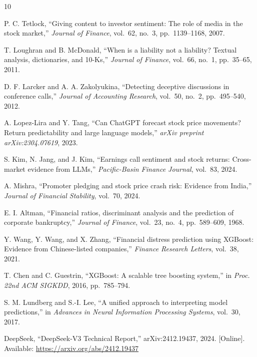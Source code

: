\documentclass[conference]{IEEEtran}
\begin{document}
\begin{thebibliography}{10}

P. C. Tetlock, ``Giving content to investor sentiment: The role of media
in the stock market,'' \textit{Journal of Finance}, vol.~62, no.~3,
pp.~1139--1168, 2007.

T. Loughran and B. McDonald, ``When is a liability not a liability?
Textual analysis, dictionaries, and 10-Ks,'' \textit{Journal of Finance},
vol.~66, no.~1, pp.~35--65, 2011.

D. F. Larcker and A. A. Zakolyukina, ``Detecting deceptive discussions in
conference calls,'' \textit{Journal of Accounting Research}, vol.~50,
no.~2, pp.~495--540, 2012.

A. Lopez-Lira and Y. Tang, ``Can ChatGPT forecast stock price movements?
Return predictability and large language models,'' \textit{arXiv preprint
arXiv:2304.07619}, 2023.

S. Kim, N. Jang, and J. Kim, ``Earnings call sentiment and stock returns:
Cross-market evidence from LLMs,'' \textit{Pacific-Basin Finance Journal},
vol.~83, 2024.

A. Mishra, ``Promoter pledging and stock price crash risk: Evidence from
India,'' \textit{Journal of Financial Stability}, vol.~70, 2024.

E. I. Altman, ``Financial ratios, discriminant analysis and the prediction
of corporate bankruptcy,'' \textit{Journal of Finance}, vol.~23, no.~4,
pp.~589--609, 1968.

Y. Wang, Y. Wang, and X. Zhang, ``Financial distress prediction using
XGBoost: Evidence from Chinese-listed companies,''
\textit{Finance Research Letters}, vol.~38, 2021.

T. Chen and C. Guestrin, ``XGBoost: A scalable tree boosting system,''
in \textit{Proc. 22nd ACM SIGKDD}, 2016, pp.~785--794.

S. M. Lundberg and S.-I. Lee, ``A unified approach to interpreting model
predictions,'' in \textit{Advances in Neural Information Processing Systems},
vol.~30, 2017.

DeepSeek, ``DeepSeek-V3 Technical Report,'' arXiv:2412.19437, 2024. [Online].
Available: \url{https://arxiv.org/abs/2412.19437}

\end{thebibliography}
\end{document}
